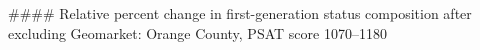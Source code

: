 #### Relative percent change in first-generation status composition after excluding Geomarket: Orange County, PSAT score 1070–1180
